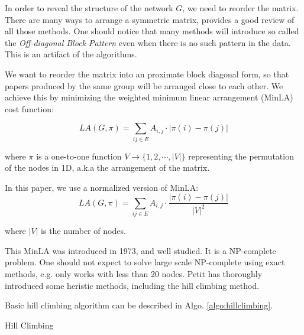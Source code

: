 In order to reveal the structure of the network $G$, we need to reorder the matrix.
There are many ways to arrange a symmetric matrix, \cite{behrisch_matrix_2016} provides a good review of all those methods.
One should notice that many methods will introduce so called the \emph{Off-diagonal Block Pattern} even when there is no such pattern in the data.
This is an artifact of the algorithms.

We want to reorder the matrix into an proximate block diagonal form, so that papers produced by the same group will be arranged close to each other.
We achieve this by minimizing the weighted minimum linear arrangement (MinLA) cost function:

\begin{equation}
    LA(G, \pi) = \sum_{ij \in E} A_{i,j} \cdot |\pi(i) - \pi(j)|
\end{equation}

where $\pi$ is a one-to-one function $V \rightarrow \{1,2,\cdots,|V|\}$ representing the permutation of the nodes in 1D, a.k.a the arrangement of the matrix.

In this paper, we use a normalized version of MinLA:
\begin{equation}
    LA(G, \pi) = \sum_{ij \in E} A_{i,j} \cdot \frac{|\pi(i) - \pi(j)|}{|V|^2}
\end{equation}

where $|V|$ is the number of nodes.

This MinLA was introduced in 1973, and well studied.
It is a NP-complete problem.
One should not expect to solve large scale NP-complete using exact methods, 
e.g. \cite{andrade_minimum_2017} only works with less than 20 nodes.
Petit \cite{petit_experiments_2004} has thoroughly introduced some heristic methods, including the hill climbing method.

Basic hill climbing algorithm can be described in Algo. \ref{algo:hillclimbing}. 

\begin{algorithm}
    \caption{Hill Climbing}\label{algo:hillclimbing}
\end{algorithm}

